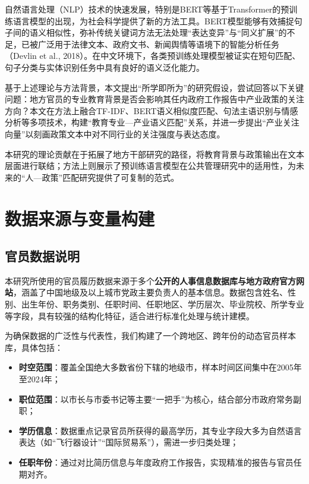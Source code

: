 \documentclass[a4paper,11pt, fontset=fandol]{ctexart}
\begin{document}
自然语言处理（NLP）技术的快速发展，特别是BERT等基于Transformer的预训练语言模型的出现，为社会科学提供了新的方法工具。BERT模型能够有效捕捉句子间的语义相似性，弥补传统关键词方法无法处理“表达变异”与“同义扩展”的不足，已被广泛用于法律文本、政府文书、新闻舆情等语境下的智能分析任务（Devlin et al., 2018）。在中文环境下，各类预训练处理模型被证实在短句匹配、句子分类与实体识别任务中具有良好的语义泛化能力。

基于上述理论与方法背景，本文提出“所学即所为”的研究假设，尝试回答以下关键问题：地方官员的专业教育背景是否会影响其任内政府工作报告中产业政策的关注方向？本文在方法上融合TF-IDF、BERT语义相似度匹配、句法主语识别与情感分析等多项技术，构建“教育专业—产业语义匹配”关系，并进一步提出“产业关注向量”以刻画政策文本中对不同行业的关注强度与表达态度。

本研究的理论贡献在于拓展了地方干部研究的路径，将教育背景与政策输出在文本层面进行联结；方法上则展示了预训练语言模型在公共管理研究中的适用性，为未来的“人—政策”匹配研究提供了可复制的范式。



\newpage

\section{数据来源与变量构建}
\subsection{官员数据说明}
本研究所使用的官员履历数据来源于多个\textbf{公开的人事信息数据库与地方政府官方网站}，涵盖了中国地级及以上城市党政主要负责人的基本信息。数据包含姓名、性别、出生年份、职务类别、任职时间、任职地区、学历层次、毕业院校、所学专业等字段，具有较强的结构化特征，适合进行标准化处理与统计建模。

为确保数据的广泛性与代表性，我们构建了一个跨地区、跨年份的动态官员样本库，具体包括：

\begin{itemize}
    \item \textbf{时空范围}：覆盖全国绝大多数省份下辖的地级市，样本时间区间集中在2005年至2024年；
    \item \textbf{职位范围}：以市长与市委书记等主要“一把手”为核心，结合部分市政府常务副职；
    \item \textbf{学历信息}：数据重点记录官员所获得的最高学历，其专业字段大多为自然语言表达（如“飞行器设计”“国际贸易系”），需进一步归类处理；
    \item \textbf{任职年份}：通过对比简历信息与年度政府工作报告，实现精准的报告与官员任期对齐。
\end{itemize}
\end{document}
